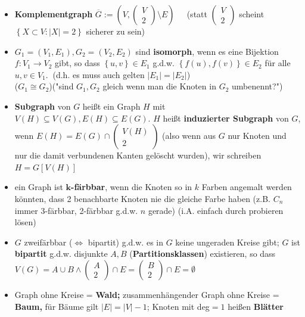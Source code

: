 \documentclass[10pt,a4paper]{article}
\begin{document}
\begin{itemize}
\item \textbf{Komplementgraph} $\overline{G}:=\left(V,\begin{pmatrix}
V\\2
\end{pmatrix}\setminus E \right)\;\;\;\;$  (statt $\begin{pmatrix} V\\2 \end{pmatrix}$ scheint $\left\lbrace X \subset V : \vert X \vert=2\right\rbrace$ sicherer zu sein)
\item $G_{1}=(V_{1},E_{1}), G_{2}=(V_{2},E_{2})$ sind \textbf{isomorph}, wenn es eine Bijektion $f:V_{1}\rightarrow V_{2}$ gibt, so dass $\left\lbrace u,v\right\rbrace \in E_{1}$ g.d.w. $\left\lbrace f(u),f(v)\right\rbrace \in E_{2}$ für alle $u,v\in V_{1}.\;\;$(d.h. es muss auch gelten $\vert E_{1}\vert=\vert E_{2}\vert$)\\  ($G_{1}\cong G_{2}$)("sind $G_{1},G_{2}$ gleich wenn man die Knoten in $G_{2}$ umbenennt?")
\item \textbf{Subgraph} von $G$ heißt ein Graph $H$ mit $V(H)\subseteq V(G),E(H)\subseteq E(G)$. $H$ heißt \textbf{induzierter Subgraph} von $G$, wenn $E(H)=E(G)\cap \begin{pmatrix} V(H)\\2\end{pmatrix}$ (also wenn aus $G$ nur Knoten und nur die damit verbundenen Kanten gelöscht wurden), wir schreiben $H=G[V(H)]$
\item ein Graph ist \textbf{$\boldsymbol{k}$-färbbar}, wenn die Knoten so in $k$ Farben angemalt werden könnten, dass 2 benachbarte Knoten nie die gleiche Farbe haben (z.B. $C_{n}$ immer 3-färbbar, 2-färbbar g.d.w. $n$ gerade) (i.A. einfach durch probieren lösen)
\item $G$ zweifärbbar ($\Leftrightarrow$ bipartit) g.d.w. es in $G$ keine ungeraden Kreise gibt; $G$ ist \textbf{bipartit} g.d.w. disjunkte $A,B$ (\textbf{Partitionsklassen}) existieren, so dass $V(G)=A\cup B\land \begin{pmatrix} A\\2\end{pmatrix}\cap E= \begin{pmatrix} B\\2\end{pmatrix}\cap E =\emptyset$
\item Graph ohne Kreise = \textbf{Wald;} zusammenhängender Graph ohne Kreise = \textbf{Baum,} für Bäume gilt $\vert E \vert =\vert V\vert -1$; Knoten mit deg$=1$ heißen \textbf{Blätter}

\end{itemize}
\end{document}
